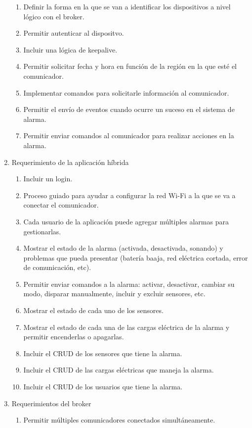 \documentclass[
11pt, %
codirector, %
]{charter}
\begin{document}
\begin{enumerate}
		\begin{enumerate}
			\item Definir la forma en la que se van a identificar los dispositivos a nivel lógico con el broker.
			\item Permitir autenticar al dispositvo.
			\item Incluir una lógica de keepalive.
			\item Permitir solicitar fecha y hora en función de la región en la que esté el comunicador.
			\item Implementar comandos para solicitarle información al comunicador.
			\item Permitir el envío de eventos cuando ocurre un suceso en el sistema de alarma.
			\item Permitir enviar comandos al comunicador para realizar acciones en la alarma.
		\end{enumerate}
	\item Requerimiento de la aplicación híbrida
		\begin{enumerate}
			\item Incluir un login.
			\item Proceso guiado para ayudar a configurar la red Wi-Fi a la que se va a conectar el comunicador.
			\item Cada usuario de la aplicación puede agregar múltiples alarmas para gestionarlas.
			\item Mostrar el estado de la alarma (activada, desactivada, sonando) y problemas que pueda presentar (batería baaja, red eléctrica cortada, error de comunicación, etc).
			\item Permitir enviar comandos a la alarma: activar, desactivar, cambiar su modo, disparar manualmente, incluir y excluir sensores, etc.
			\item Mostrar el estado de cada uno de los sensores.
			\item Mostrar el estado de cada una de las cargas eléctrica de la alarma y permitir encenderlas o apagarlas.
			\item Incluir el CRUD de los sensores que tiene la alarma.
			\item Incluir el CRUD de las cargas eléctricas que maneja la alarma.
			\item Incluir el CRUD de los usuarios que tiene la alarma.
		\end{enumerate}
	\item Requerimientos del broker
		\begin{enumerate}
			\item Permitir múltiples comunicadores conectados simultáneamente.

\end{enumerate}
\end{enumerate}
\end{document}
